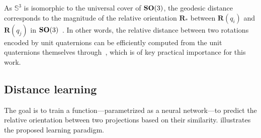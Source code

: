 As $\mathbb{S}^3$ is isomorphic to the universal cover of $\mathrm{\mathbf{SO}}(3)$, the geodesic distance corresponds to the magnitude of the relative orientation $\mathbf{R}_*$ between $\mathbf{R}(q_i)$ and $\mathbf{R}(q_j)$ in $\mathrm{\mathbf{SO}}(3)$~\cite{huynh2009metrics}.
In other words, the relative distance between two rotations encoded by unit quaternions can be efficiently computed from the unit quaternions themselves through~, which is of key practical importance for this work.



\subsection{Distance learning}%



The goal is to train a function---parametrized as a neural network---to predict the relative orientation between two projections based on their similarity.  illustrates the proposed learning paradigm.

